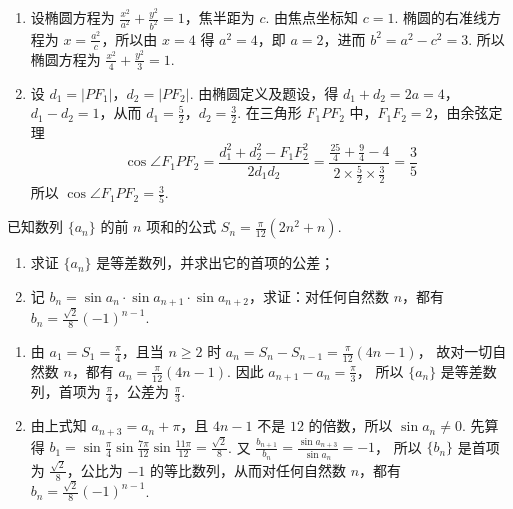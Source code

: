 \documentclass[UTF8,a4paper,oneside,11pt]{ctexbook}
\begin{document}
\begin{solution}
\begin{enumerate}
\item 设椭圆方程为 \(\frac{x^2}{a^2}+\frac{y^2}{b^2}=1\)，焦半距为 \(c\). 由焦点坐标知 \(c=1\). 椭圆的右准线方程为 \(x=\frac{a^2}{c}\)，所以由 \(x=4\) 得 \(a^2=4\)，即 \(a=2\)，进而 \(b^2=a^2-c^2=3\). 所以椭圆方程为 \(\frac{x^2}{4}+\frac{y^2}{3}=1\).

\item 设 \(d_1=|PF_1|\)，\(d_2=|PF_2|\). 由椭圆定义及题设，得 \(d_1+d_2=2a=4\)，\(d_1-d_2=1\)，从而 \(d_1=\frac52\)，\(d_2=\frac32\). 在三角形 \(F_1PF_2\) 中，\(F_1F_2=2\)，由余弦定理
\[
\cos\angle F_1PF_2=\frac{d_1^2+d_2^2-F_1F_2^2}{2d_1d_2}=\frac{\frac{25}{4}+\frac94-4}{2\times\frac52\times\frac32}=\frac35
\]
所以 \(\cos\angle F_1PF_2=\frac35\).
\end{enumerate}
\end{solution}

\begin{problem}
已知数列 \(\{a_n\}\) 的前 \(n\) 项和的公式 \(S_n=\frac{\pi}{12}(2n^2+n)\).

\begin{enumerate}
\item 求证 \(\{a_n\}\) 是等差数列，并求出它的首项的公差；
\item 记 \(b_n=\sin a_n\cdot \sin a_{n+1}\cdot \sin a_{n+2}\)，求证：对任何自然数 \(n\)，都有 \(b_n=\frac{\sqrt{2}}{8}(-1)^{n-1}\).
\end{enumerate}
\end{problem}

\begin{solution}
\begin{enumerate}
\item 由 \(a_1=S_1=\frac\pi4\)，且当 \(n\geqslant2\) 时
\(a_n=S_n-S_{n-1}=\frac\pi{12}(4n-1)\)，
故对一切自然数 \(n\)，都有 \(a_n=\frac\pi{12}(4n-1)\). 因此
\(a_{n+1}-a_n=\frac\pi3\)，
所以 \(\{a_n\}\) 是等差数列，首项为 \(\frac\pi4\)，公差为 \(\frac\pi3\).

\item 由上式知 \(a_{n+3}=a_n+\pi\)，且 \(4n-1\) 不是 \(12\) 的倍数，所以 \(\sin a_n\neq0\). 先算得
\(b_1=\sin\frac\pi4\sin\frac{7\pi}{12}\sin\frac{11\pi}{12}=\frac{\sqrt{2}}8\).
又
\(\frac{b_{n+1}}{b_n}=\frac{\sin a_{n+3}}{\sin a_n}=-1\)，
所以 \(\{b_n\}\) 是首项为 \(\frac{\sqrt{2}}8\)，公比为 \(-1\) 的等比数列，从而对任何自然数 \(n\)，都有
\(b_n=\frac{\sqrt{2}}8(-1)^{n-1}\).
\end{enumerate}
\end{solution}

\end{document}
